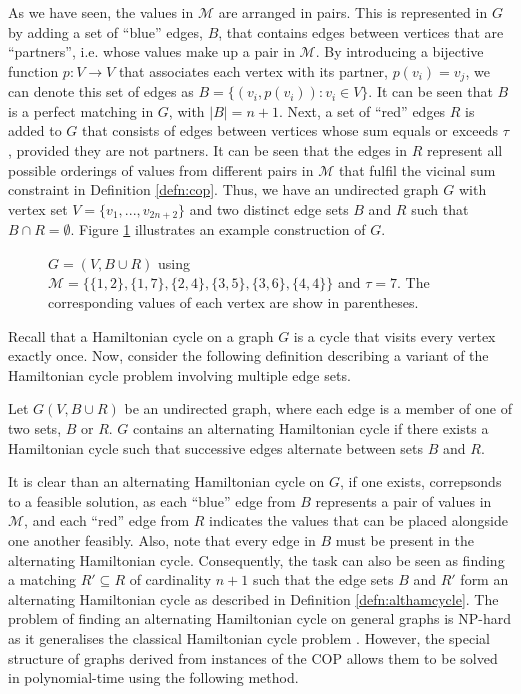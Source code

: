 \documentclass[runningheads]{llncs}
\begin{document}
As we have seen, the values in $\mathcal{M}$ are arranged in pairs. This is represented in $G$ by adding a set of ``blue'' edges, $B$, that contains edges between vertices that are ``partners'', i.e. whose values make up a pair in $\mathcal{M}$. By introducing a bijective function $p: V \to V$ that associates each vertex with its partner, $p(v_i) = v_j$, we can denote this set of edges as $B = \{(v_i, p(v_i)) : v_i \in V\}$. It can be seen that $B$ is a perfect matching in $G$, with $|B| = n+1$. Next, a set of ``red'' edges $R$ is added to $G$ that consists of edges between vertices whose sum equals or exceeds $\tau$, provided they are not partners. It can be seen that the edges in $R$ represent all possible orderings of values from different pairs in $\mathcal{M}$ that fulfil the vicinal sum constraint in Definition \ref{defn:cop}. Thus, we have an undirected graph $G$ with vertex set $V = \{v_1, ..., v_{2n+2}\}$ and two distinct edge sets $B$ and $R$ such that $B \cap R = \emptyset$. Figure \ref{fig:threshold} illustrates an example construction of $G$.
\begin{figure}[h!]	
\centering
	
	\caption{$G = (V, B \cup R)$ using $\mathcal{M} = \{\{1,2\}, \{1,7\}, \{2,4\}, \{3,5\}, \{3,6\}, \{4,4\}\}$ and $\tau = 7$. The corresponding values of each vertex are show in parentheses.}
	\label{fig:threshold}
\end{figure}

Recall that a Hamiltonian cycle on a graph $G$ is a cycle that visits every vertex exactly once. Now, consider the following definition describing a variant of the Hamiltonian cycle problem involving multiple edge sets.
\begin{definition}
	\label{defn:althamcycle}
	Let $G(V, B\cup R)$ be an undirected graph, where each edge is a member of one of two sets, $B$ or $R$. $G$ contains an alternating Hamiltonian cycle if there exists a Hamiltonian cycle such that successive edges alternate between sets $B$ and $R$.
\end{definition}

It is clear than an alternating Hamiltonian cycle on $G$, if one exists, correpsonds to a feasible solution, as each ``blue'' edge from $B$ represents a pair of values in $\mathcal{M}$, and each ``red'' edge from $R$ indicates the values that can be placed alongside one another feasibly. Also, note that every edge in $B$ must be present in the alternating Hamiltonian cycle. Consequently, the task can also be seen as finding a matching $R' \subseteq R$ of cardinality $n+1$ such that the edge sets $B$ and $R'$ form an alternating Hamiltonian cycle as described in Definition \ref{defn:althamcycle}. The problem of finding an alternating Hamiltonian cycle on general graphs is NP-hard as it generalises the classical Hamiltonian cycle problem \cite{haggkvist1977}. However, the special structure of graphs derived from instances of the COP allows them to be solved in polynomial-time using the following method.
\end{document}
